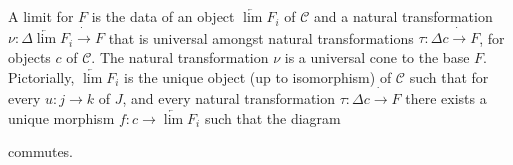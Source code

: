 \documentclass[10pt]{amsart}
\begin{document}
\begin{defn}[Limit]
    A limit for $F$ is the data of an object $\underleftarrow{\lim}F_i$ of $\mathcal{C}$ and a natural transformation $\nu \colon \Delta \underleftarrow{\lim}F_i \dot{\rightarrow} F$ that is universal amongst natural transformations $\tau \colon \Delta c \dot{\rightarrow} F$, for objects $c$ of $\mathcal{C}$.
    The natural transformation $\nu$ is a universal cone to the base $F$.
    Pictorially, $\underleftarrow{\lim}F_i$ is the unique object (up to isomorphism) of $\mathcal{C}$ such that for every $u \colon j \rightarrow k$ of $J$, and every natural transformation $\tau \colon \Delta c \dot{\rightarrow} F$ there exists a unique morphism $f \colon c \rightarrow \underleftarrow{\lim}F_i$ such that the diagram
  \begin{center}
\end{center}
  commutes.
\end{defn}

\end{document}
